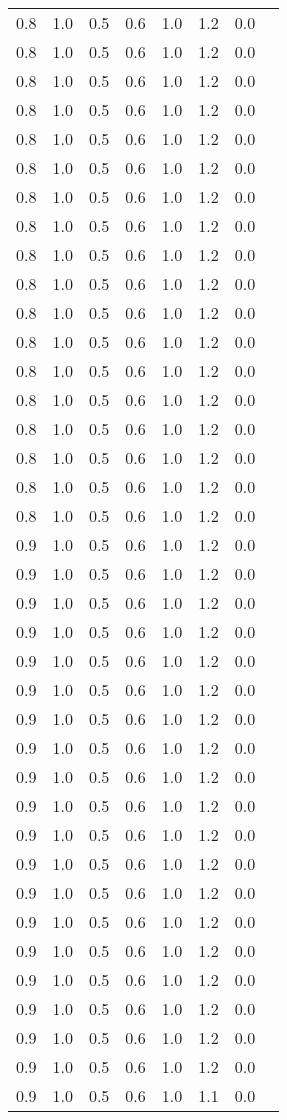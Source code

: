 \begin{tabular}{L{1in}|L{1in}|L{1in}|L{1in}|L{1in}|L{1in}|L{1in}|L{1in}}
0.8&1.0&0.5&0.6&1.0&1.2&0.0\\
0.8&1.0&0.5&0.6&1.0&1.2&0.0\\
0.8&1.0&0.5&0.6&1.0&1.2&0.0\\
0.8&1.0&0.5&0.6&1.0&1.2&0.0\\
0.8&1.0&0.5&0.6&1.0&1.2&0.0\\
0.8&1.0&0.5&0.6&1.0&1.2&0.0\\
0.8&1.0&0.5&0.6&1.0&1.2&0.0\\
0.8&1.0&0.5&0.6&1.0&1.2&0.0\\
0.8&1.0&0.5&0.6&1.0&1.2&0.0\\
0.8&1.0&0.5&0.6&1.0&1.2&0.0\\
0.8&1.0&0.5&0.6&1.0&1.2&0.0\\
0.8&1.0&0.5&0.6&1.0&1.2&0.0\\
0.8&1.0&0.5&0.6&1.0&1.2&0.0\\
0.8&1.0&0.5&0.6&1.0&1.2&0.0\\
0.8&1.0&0.5&0.6&1.0&1.2&0.0\\
0.8&1.0&0.5&0.6&1.0&1.2&0.0\\
0.8&1.0&0.5&0.6&1.0&1.2&0.0\\
0.8&1.0&0.5&0.6&1.0&1.2&0.0\\
0.9&1.0&0.5&0.6&1.0&1.2&0.0\\
0.9&1.0&0.5&0.6&1.0&1.2&0.0\\
0.9&1.0&0.5&0.6&1.0&1.2&0.0\\
0.9&1.0&0.5&0.6&1.0&1.2&0.0\\
0.9&1.0&0.5&0.6&1.0&1.2&0.0\\
0.9&1.0&0.5&0.6&1.0&1.2&0.0\\
0.9&1.0&0.5&0.6&1.0&1.2&0.0\\
0.9&1.0&0.5&0.6&1.0&1.2&0.0\\
0.9&1.0&0.5&0.6&1.0&1.2&0.0\\
0.9&1.0&0.5&0.6&1.0&1.2&0.0\\
0.9&1.0&0.5&0.6&1.0&1.2&0.0\\
0.9&1.0&0.5&0.6&1.0&1.2&0.0\\
0.9&1.0&0.5&0.6&1.0&1.2&0.0\\
0.9&1.0&0.5&0.6&1.0&1.2&0.0\\
0.9&1.0&0.5&0.6&1.0&1.2&0.0\\
0.9&1.0&0.5&0.6&1.0&1.2&0.0\\
0.9&1.0&0.5&0.6&1.0&1.2&0.0\\
0.9&1.0&0.5&0.6&1.0&1.2&0.0\\
0.9&1.0&0.5&0.6&1.0&1.2&0.0\\
0.9&1.0&0.5&0.6&1.0&1.1&0.0\\

\end{tabular}
